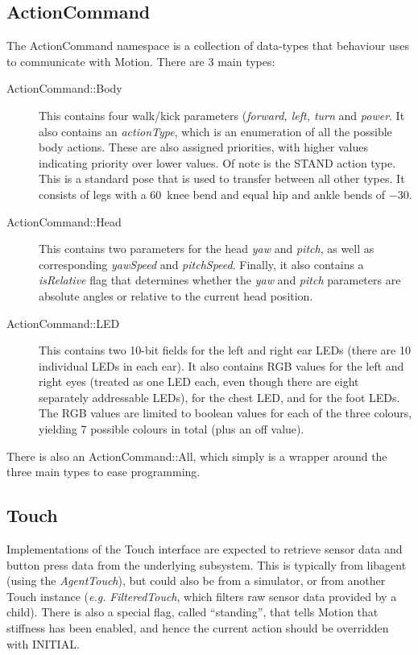 \documentclass[pdftex,11pt,a4paper]{report}
\begin{document}
\subsection{ActionCommand}
The ActionCommand namespace is a collection of data-types that behaviour
uses to communicate with Motion. There are 3 main types:
\begin{description}
    \item[ActionCommand::Body] This contains four walk/kick parameters
        (\emph{forward, left, turn} and \emph{power}. It also contains an
        \emph{actionType}, which is an enumeration of all the possible body
        actions. These are also assigned priorities, with higher values
        indicating priority over lower values. Of note is the STAND action
        type. This is a standard pose that is used to transfer between all
        other types. It consists of legs with a 60\textdegree~knee bend and
        equal hip and ankle bends of $-30$\textdegree.
    \item[ActionCommand::Head] This contains two parameters for the head
        \emph{yaw} and \emph{pitch}, as well as corresponding
        \emph{yawSpeed} and \emph{pitchSpeed}. Finally, it also contains a
        \emph{isRelative} flag that determines whether the \emph{yaw} and
        \emph{pitch} parameters are absolute angles or relative to the
        current head position.
    \item[ActionCommand::LED] This contains two 10-bit fields for the
        left and right ear LEDs (there are 10 individual LEDs in each ear).
        It also contains RGB values for the left and right eyes (treated as
        one LED each, even though there are eight separately addressable
        LEDs), for the chest LED, and for the foot LEDs. The RGB values are
        limited to boolean values for each of the three colours, yielding 7
        possible colours in total (plus an off value).
\end{description}

There is also an ActionCommand::All, which simply is a wrapper around the
three main types to ease programming.

\subsection{Touch}
Implementations of the Touch interface are expected to retrieve sensor data
and button press data from the underlying subsystem. This is typically from
libagent (using the \emph{AgentTouch}), but could also be from a simulator,
or from another Touch instance (\textit{e.g.} \emph{FilteredTouch}, which
filters raw sensor data provided by a child). There is also a special
flag, called ``standing'', that tells Motion that stiffness has been
enabled, and hence the current action should be overridden with INITIAL.
\end{document}
